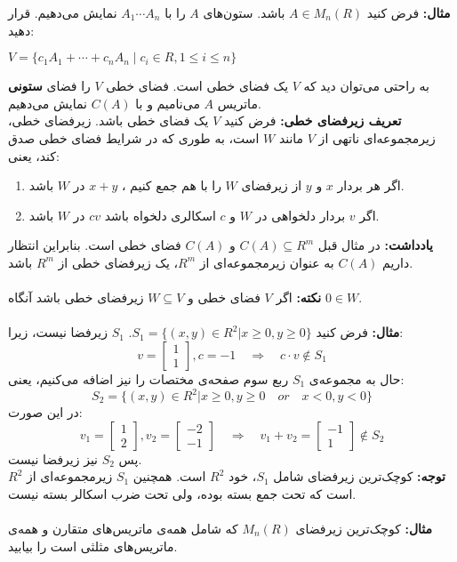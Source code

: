\textbf{مثال:}
فرض کنید $A\in M_{n}(R)$ باشد. ستون‌های $A$ را با $A_{1}\cdots A_{n}$ نمایش می‌دهیم. قرار دهید:
\begin{flushleft}$V = \{c_{1}A_{1}+\cdots+c_{n}A_{n} \; | \; c_{i}\in R, 1\leq i \leq n\}$\end{flushleft}
به راحتی می‌توان دید که $V$ یک فضا‌ی خطی است. فضا‌ی خطی $V$ را فضا‌ی \textbf{ستونی} ماتریس $A$ می‌نامیم و با $C(A)$ نمایش می‌دهیم.\\
\textbf{تعریف زیرفضای خطی:}
فرض کنید $V$ یک فضا‌ی خطی باشد. زیر‌فضا‌ی خطی، زیر‌مجموعه‌ای ناتهی از $V$ مانند $W$ است، به طوری که در شرایط فضا‌ی خطی صدق کند، یعنی:
\begin{enumerate}
	\item اگر هر بردار $x$ و $y$ از زیر‌فضا‌ی $W$ را با هم جمع کنیم ، $x+y$ در $W$ باشد.
	\item اگر $v$ بردار دلخواهی در $W$ و $c$ اسکالری دلخواه باشد $cv$ در $W$ باشد.
\end{enumerate}

\textbf{یادداشت:} در مثال قبل $C(A)\subseteq R^m$ و $C(A)$ فضا‌ی خطی است. بنابراین انتظار داریم $C(A)$ به عنوان زیر‌مجموعه‌ای از $R^m$، یک زیر‌فضا‌ی خطی از $R^m$ باشد.\\\\

\textbf{نکته:}
اگر $V$ فضا‌ی خطی و $W\subseteq V$ زیر‌فضا‌ی خطی باشد آنگاه $0\in W$.\\\\
\textbf{مثال:}
فرض کنید $S_{1} = \{(x,y)\in R^2|x\geq0 , y\geq0\}$. $S_{1}$ زیر‌فضا نیست، زیرا: $$v = \begin{bmatrix}
1\\1
\end{bmatrix}, c=-1 \quad\Rightarrow\quad c\cdot v\notin S_{1}$$
حال به مجموعه‌ی $S_{1}$ ربع سوم صفحه‌ی مختصات را نیز اضافه می‌کنیم، یعنی: $${S_{2}= \{(x,y)\in R^2|x\geq0,y\geq0 \quad\textit{or}\quad x<0 , y<0\} }$$ در این صورت:
$$v_{1}=\begin{bmatrix}
1\\2
\end{bmatrix}, v_{2}=\begin{bmatrix}
-2\\-1
\end{bmatrix}\quad\Rightarrow\quad v_{1}+v_{2} = \begin{bmatrix}
-1\\1
\end{bmatrix}\notin S_{2}$$
پس $S_{2}$ نیز زیر‌فضا نیست.\\
\textbf{توجه: }کوچک‌ترین زیر‌فضا‌ی شامل $S_{1}$، خود $R^2$ است. همچنین $S_{1}$ زیر‌مجموعه‌ای از $R^2$ است که تحت جمع بسته بوده، ولی تحت ضرب اسکالر بسته نیست.\\\\
\textbf{مثال:}
کوچک‌ترین زیر‌فضا‌ی $M_{n}(R)$ که شامل همه‌ی ماتریس‌های متقارن و همه‌ی ماتریس‌های مثلثی است را بیابید.

